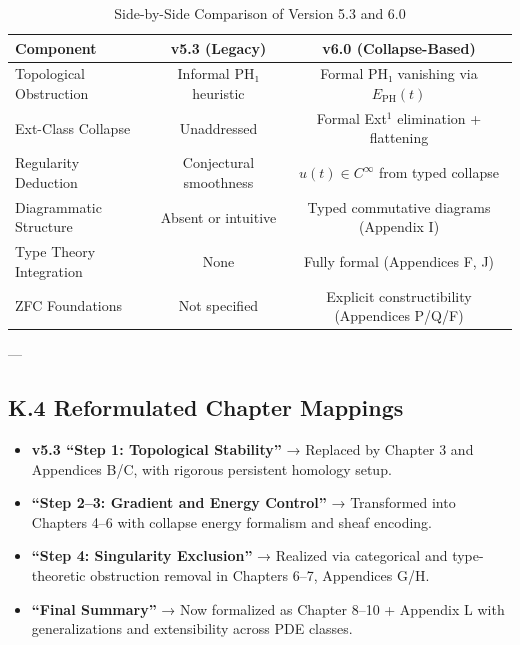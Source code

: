 \documentclass[11pt]{article}
\begin{document}
{{\begin{table}[h!]
\centering
\begin{tabular}{|l|c|c|}
\hline
\textbf{Component} & \textbf{v5.3 (Legacy)} & \textbf{v6.0 (Collapse-Based)} \\
\hline
Topological Obstruction & Informal PH₁ heuristic & Formal PH₁ vanishing via \( E_{\mathrm{PH}}(t) \) \\
Ext-Class Collapse       & Unaddressed           & Formal Ext$^1$ elimination + flattening \\
Regularity Deduction     & Conjectural smoothness & \( u(t) \in C^\infty \) from typed collapse \\
Diagrammatic Structure   & Absent or intuitive    & Typed commutative diagrams (Appendix I) \\
Type Theory Integration  & None                   & Fully formal (Appendices F, J) \\
ZFC Foundations          & Not specified          & Explicit constructibility (Appendices P/Q/F) \\
\hline
\end{tabular}
\caption{Side-by-Side Comparison of Version 5.3 and 6.0}
\end{table}

---

\subsection*{K.4 Reformulated Chapter Mappings}

\begin{itemize}
  \item \textbf{v5.3 “Step 1: Topological Stability”}  
    → Replaced by Chapter 3 and Appendices B/C, with rigorous persistent homology setup.

  \item \textbf{“Step 2–3: Gradient and Energy Control”}  
    → Transformed into Chapters 4–6 with collapse energy formalism and sheaf encoding.

  \item \textbf{“Step 4: Singularity Exclusion”}  
    → Realized via categorical and type-theoretic obstruction removal in Chapters 6–7, Appendices G/H.

  \item \textbf{“Final Summary”}  
    → Now formalized as Chapter 8–10 + Appendix L with generalizations and extensibility across PDE classes.
\end{itemize}

}}
\end{document}
